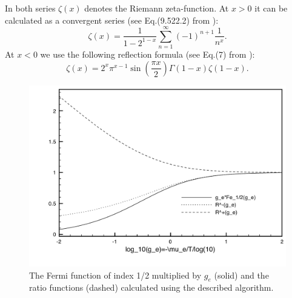In both series $\zeta(x)$ denotes the Riemann zeta-function.
At $x > 0$ it can be calculated as a convergent series (see Eq.(9.522.2) from \cite{gradshtein}): %
\begin{equation}
\zeta(x) = \frac{1}{1-2^{1-x}} \sum_{n=1}^\infty{(-1)^{n+1} \frac{1}{n^x}}.
\end{equation}
At $x < 0$ we use the following reflection formula (see Eq.(7) from \cite{mcleod}): %
\begin{equation}
\zeta(x) = 2^x \pi^{x-1} \sin(\frac{\pi x}{2}) \Gamma(1-x) \zeta(1-x).
\end{equation}

\begin{figure}[ht]
\centering
\includegraphics[scale=0.6]{FermiFunctionFig.pdf}
\caption{The Fermi function of index 1/2 multiplied by $g_e$ (solid) and the ratio functions (dashed) calculated using the described algorithm.}
\end{figure}

